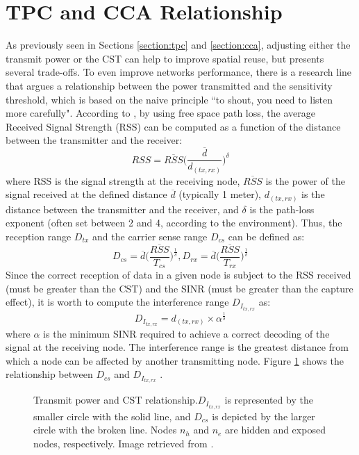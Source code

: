 \documentclass[12pt, a4paper,twoside]{tesi_upf}
\begin{document}
		\section{TPC and CCA Relationship}
		\label{section:tpc_cst_relationship}
			As previously seen in Sections \ref{section:tpc} and \ref{section:cca}, adjusting either the transmit power or the CST can help to improve spatial reuse, but presents several trade-offs. To even improve networks performance, there is a research line that argues a relationship between the power transmitted and the sensitivity threshold, which is based on the naive principle ``to shout, you need to listen more carefully". According to \cite{thorpe2014survey}, by using free space path loss, the average Received Signal Strength (RSS) can be computed as a function of the distance between the transmitter and the receiver:		
			\begin{equation}
				RSS = \overline{RSS} \Big( \frac{\overline{d}}{d_{(tx,rx)}} \Big)^{\delta}
				\nonumber
			\end{equation}
			where RSS is the signal strength at the receiving node, $\overline{RSS}$ is the power of the signal received at the defined distance $\overline{d}$ (typically 1 meter), $d_{(tx,rx)}$ is the distance between the transmitter and the receiver, and $\delta$ is the path-loss exponent (often set between 2 and 4, according to the environment).  Thus, the reception range $D_{tx}$ and the carrier sense range $D_{cs}$ can be defined as:
			\begin{equation}
				D_{cs} = \overline{d} \Big( \frac{\overline{RSS}}{T_{cs}} \Big)^\frac{1}{\delta}, 				D_{rx} = \overline{d} \Big( \frac{\overline{RSS}}{T_{rx}} \Big)^\frac{1}{\delta}
				\nonumber
			\end{equation}
			Since the correct reception of data in a given node is subject to the RSS received (must be greater than the CST) and the SINR (must be greater than the capture effect), it is worth to compute the interference range $D_{I_{tx,rx}}$ as:					
			\begin{equation}
				D_{I_{tx,rx}} = d_{(tx,rx)} \times \alpha ^{\frac{1}{\delta}}
				\nonumber
			\end{equation}			
			where $\alpha$ is the minimum SINR required to achieve a correct decoding of the signal at the receiving node. The interference range is the greatest distance from which a node can be affected by another transmitting node. Figure \ref{fig:tx_cca_relation} shows the relationship between $D_{cs}$ and $D_{I_{tx,rx}}$ . 
			\begin{figure}[h!]
				\centering
				\caption{Transmit power and CST relationship.$D_{I_{tx,rx}}$ is represented by the smaller circle with the solid line, and $D_{cs}$ is depicted by the larger circle with the broken line. Nodes $n_h$ and $n_e$ are hidden and exposed nodes, respectively. Image retrieved from \cite{thorpe2014survey}.}
				\label{fig:tx_cca_relation}
			\end{figure}	
			
\end{document}
